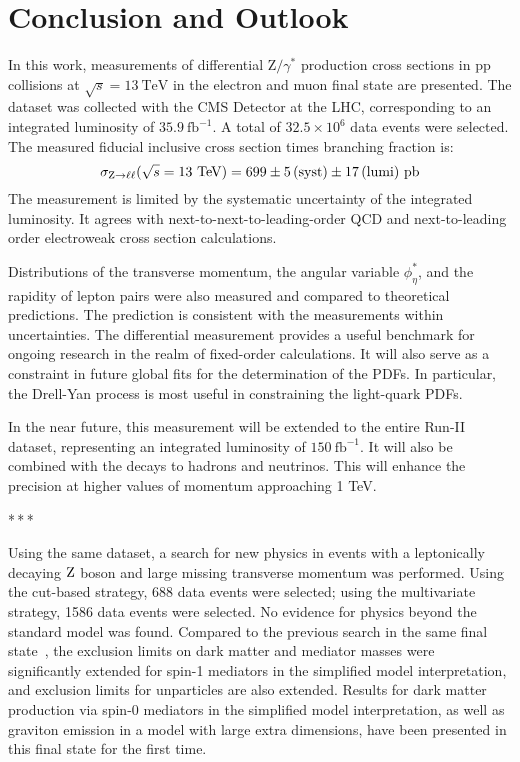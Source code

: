 \chapter{Conclusion and Outlook}

In this work, measurements of differential $\mathrm{Z}/\gamma^{*}$ production cross sections in $\mathrm{p}\mathrm{p}$ collisions at $\sqrt{s}=13~\mathrm{TeV}$ in the electron and muon final state
are presented.
The dataset was collected with the CMS Detector at the LHC, corresponding to an integrated luminosity of $35.9~\mathrm{fb}^{-1}$.
A total of $32.5 \times 10^{6}$ data events were selected.
The measured fiducial inclusive cross section times branching fraction is: 
\begin{equation*}
\sigma_{\mathrm{Z} \to \ell\ell}(\sqrt{s}=13~\mathrm{TeV}) = 699\pm5\,\text{(syst)}\pm17\,\text{(lumi)}~\mathrm{pb}
\end{equation*}
The measurement is limited by the systematic uncertainty of the integrated luminosity.
It agrees with next-to-next-to-leading-order QCD and next-to-leading order electroweak cross section calculations. 

Distributions of the transverse momentum, the angular variable $\phi^{*}_\eta$, and the rapidity of lepton pairs were also measured and compared to theoretical predictions.
The prediction is consistent with the measurements within uncertainties.
The differential measurement provides a useful benchmark for ongoing research in the realm of fixed-order calculations.
It will also serve as a constraint in future global fits for the determination of the PDFs.
In particular, the Drell-Yan process is most useful in constraining the light-quark PDFs.

In the near future, this measurement will be extended to the entire Run-II dataset,
representing an integrated luminosity of $150~\mathrm{fb}^{-1}$.
It will also be combined with the decays to hadrons and neutrinos.
This will enhance the precision at higher values of momentum approaching 1 TeV.

\bigskip\par\centerline{*\,*\,*}\medskip\par

Using the same dataset, a search for new physics in events with a
leptonically decaying $\mathrm{Z}$ boson and large missing transverse momentum was performed.
Using the cut-based strategy, 688 data events were selected;
using the multivariate strategy, 1586 data events were selected.
No evidence for physics beyond the standard model was found.
Compared to the previous search in the same final state~\cite{CMS-PAPER-EXO-16-010},
the exclusion limits on dark matter and mediator masses were significantly extended for spin-1 mediators in the simplified model interpretation, and exclusion limits for unparticles are also extended.
Results for dark matter production via spin-0 mediators in the simplified model interpretation,
as well as graviton emission in a model with large extra dimensions,
have been presented in this final state for the first time.

